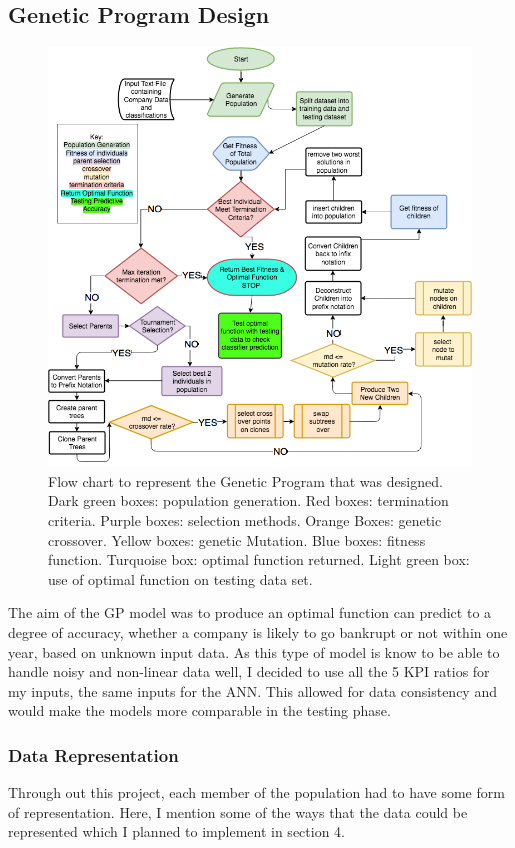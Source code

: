 \documentclass[11pt]{article}
\begin{document}
\subsection{Genetic Program Design}\label{subsec:gpDes}
\begin{figure}[h]
\centering
\includegraphics[scale = .55]{GPFlowReformat} 
\caption{Flow chart to represent the Genetic Program that was designed. Dark green boxes: population generation. Red boxes: termination criteria. Purple boxes: selection methods. Orange Boxes: genetic crossover. Yellow boxes: genetic Mutation. Blue boxes: fitness function. Turquoise box: optimal function returned. Light green box: use of optimal function on testing data set.} 
\end{figure}
The aim of the GP model was to produce an optimal function can predict to a degree of accuracy, whether a company is likely to go bankrupt or not within one year, based on unknown input data. As this type of model is know to be able to handle noisy and non-linear data well, I decided to use all the 5 KPI ratios for my inputs, the same inputs for the ANN. This allowed for data consistency and would make the models more comparable in the testing phase.
\subsubsection{Data Representation}\label{subsubsec:dataRep}
Through out this project, each member of the population had to have some form of representation. Here, I mention some of the ways that the data could be represented which I planned to implement in section 4. 
\end{document}
